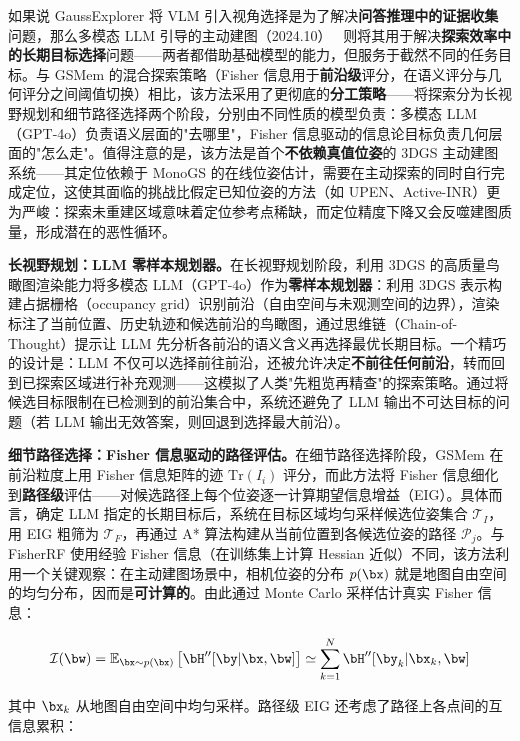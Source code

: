 如果说 GaussExplorer 将 VLM 引入视角选择是为了解决\textbf{问答推理中的证据收集}问题，那么多模态 LLM 引导的主动建图（2024.10）~\cite{2410_17422} 则将其用于解决\textbf{探索效率中的长期目标选择}问题——两者都借助基础模型的能力，但服务于截然不同的任务目标。与 GSMem 的混合探索策略（Fisher 信息用于\textbf{前沿级}评分，在语义评分与几何评分之间阈值切换）相比，该方法采用了更彻底的\textbf{分工策略}——将探索分为长视野规划和细节路径选择两个阶段，分别由不同性质的模型负责：多模态 LLM（GPT-4o）负责语义层面的"去哪里"，Fisher 信息驱动的信息论目标负责几何层面的"怎么走"。值得注意的是，该方法是首个\textbf{不依赖真值位姿}的 3DGS 主动建图系统——其定位依赖于 MonoGS 的在线位姿估计，需要在主动探索的同时自行完成定位，这使其面临的挑战比假定已知位姿的方法（如 UPEN、Active-INR）更为严峻：探索未重建区域意味着定位参考点稀缺，而定位精度下降又会反噬建图质量，形成潜在的恶性循环。

\textbf{长视野规划：LLM 零样本规划器。}在长视野规划阶段，利用 3DGS 的高质量鸟瞰图渲染能力将多模态 LLM（GPT-4o）作为\textbf{零样本规划器}：利用 3DGS 表示构建占据栅格（occupancy grid）识别前沿（自由空间与未观测空间的边界），渲染标注了当前位置、历史轨迹和候选前沿的鸟瞰图，通过思维链（Chain-of-Thought）提示让 LLM 先分析各前沿的语义含义再选择最优长期目标。一个精巧的设计是：LLM 不仅可以选择前往前沿，还被允许决定\textbf{不前往任何前沿}，转而回到已探索区域进行补充观测——这模拟了人类"先粗览再精查"的探索策略。通过将候选目标限制在已检测到的前沿集合中，系统还避免了 LLM 输出不可达目标的问题（若 LLM 输出无效答案，则回退到选择最大前沿）。

\textbf{细节路径选择：Fisher 信息驱动的路径评估。}在细节路径选择阶段，GSMem 在前沿粒度上用 Fisher 信息矩阵的迹 $\text{Tr}(I_i)$ 评分，而此方法将 Fisher 信息细化到\textbf{路径级}评估——对候选路径上每个位姿逐一计算期望信息增益（EIG）。具体而言，确定 LLM 指定的长期目标后，系统在目标区域均匀采样候选位姿集合 $\mathcal{T}_I$，用 EIG 粗筛为 $\mathcal{T}_F$，再通过 A* 算法构建从当前位置到各候选位姿的路径 $\mathcal{P}_j$。与 FisherRF 使用经验 Fisher 信息（在训练集上计算 Hessian 近似）不同，该方法利用一个关键观察：在主动建图场景中，相机位姿的分布 $p(\bx)$ 就是地图自由空间的均匀分布，因而是\textbf{可计算的}。由此通过 Monte Carlo 采样估计真实 Fisher 信息：

\begin{equation}
\mathcal{I}(\bw) = \mathbb{E}_{\bx \sim p(\bx)} \left[ \bH''[\by| \bx, \bw] \right] \simeq \sum_{k=1}^{N} \bH''[\by_k| \bx_k, \bw]
\end{equation}

其中 $\bx_k$ 从地图自由空间中均匀采样。路径级 EIG 还考虑了路径上各点间的互信息累积：

